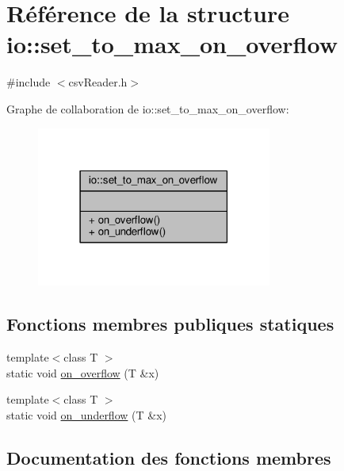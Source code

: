\hypertarget{structio_1_1set__to__max__on__overflow}{}\section{Référence de la structure io\+:\+:set\+\_\+to\+\_\+max\+\_\+on\+\_\+overflow}
\label{structio_1_1set__to__max__on__overflow}


{\ttfamily \#include $<$csv\+Reader.\+h$>$}



Graphe de collaboration de io\+:\+:set\+\_\+to\+\_\+max\+\_\+on\+\_\+overflow\+:
\nopagebreak
\begin{figure}[H]
\begin{center}
\leavevmode
\includegraphics[width=219pt]{structio_1_1set__to__max__on__overflow__coll__graph}
\end{center}
\end{figure}
\subsection*{Fonctions membres publiques statiques}
\begin{DoxyCompactItemize}
\item 
{\footnotesize template$<$class T $>$ }\\static void \hyperlink{structio_1_1set__to__max__on__overflow_a770dee97a1ee55131163e6be8d4c0d9d}{on\+\_\+overflow} (T \&x)
\item 
{\footnotesize template$<$class T $>$ }\\static void \hyperlink{structio_1_1set__to__max__on__overflow_a812d316e2b23247df19ca83bfda90a59}{on\+\_\+underflow} (T \&x)
\end{DoxyCompactItemize}


\subsection{Documentation des fonctions membres}
\mbox{\label{structio_1_1set__to__max__on__overflow_a770dee97a1ee55131163e6be8d4c0d9d}} 
